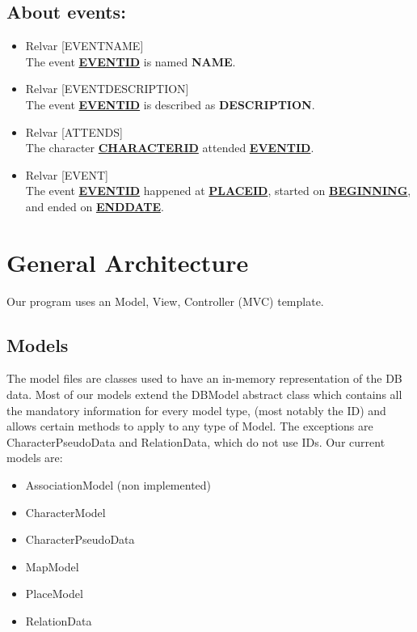 \documentclass[a4paper ,12pt,french]{article}
\begin{document}
\subsection*{About events:}
\begin{itemize}
\item Relvar [EVENTNAME] \\   The event \underline{\textbf{EVENTID}} is named \textbf{NAME}.
\item Relvar [EVENTDESCRIPTION] \\   The event \underline{\textbf{EVENTID}} is described as \textbf{DESCRIPTION}.
\item Relvar [ATTENDS] \\   The character \underline{\textbf{CHARACTERID}} attended \underline{\textbf{EVENTID}}.
\item Relvar [EVENT] \\   The event \underline{\textbf{EVENTID}} happened at \underline{\textbf{PLACEID}}, started on \underline{\textbf{BEGINNING}}, and ended on \underline{\textbf{ENDDATE}}.
\end{itemize}

\section{General Architecture}
Our program uses an Model, View, Controller (MVC) template. 

\subsection{Models}
The model files are classes used to have an in-memory representation of the DB data. Most of our models extend the DBModel abstract class which contains all the mandatory information for every model type, (most notably the ID) and allows certain methods to apply to any type of Model. The exceptions are CharacterPseudoData and RelationData, which do not use IDs. Our current models are:
\begin{itemize}
\item AssociationModel (non implemented)
\item CharacterModel
\item CharacterPseudoData
\item MapModel
\item PlaceModel
\item RelationData
\end{itemize} 
\end{document}
